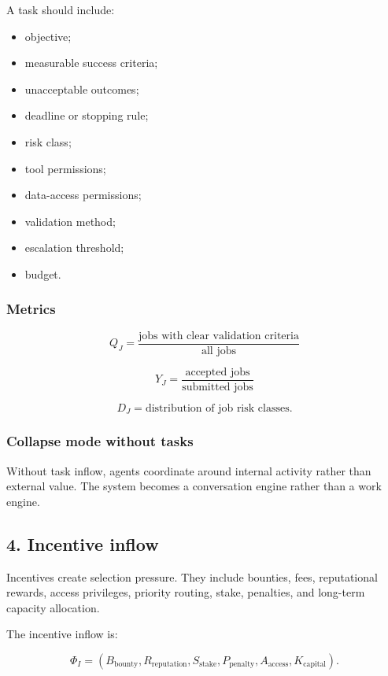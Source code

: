 A task should include:

\begin{itemize}
\tightlist
\item
  objective;
\item
  measurable success criteria;
\item
  unacceptable outcomes;
\item
  deadline or stopping rule;
\item
  risk class;
\item
  tool permissions;
\item
  data-access permissions;
\item
  validation method;
\item
  escalation threshold;
\item
  budget.
\end{itemize}

\subsubsection{Metrics}\label{metrics-2}

\[
Q_J=\frac{\text{jobs with clear validation criteria}}{\text{all jobs}}
\]

\[
Y_J=\frac{\text{accepted jobs}}{\text{submitted jobs}}
\]

\[
D_J=\text{distribution of job risk classes}.
\]

\subsubsection{Collapse mode without
tasks}\label{collapse-mode-without-tasks}

Without task inflow, agents coordinate around internal activity rather
than external value. The system becomes a conversation engine rather
than a work engine.

\subsection{4. Incentive inflow}\label{incentive-inflow}

Incentives create selection pressure. They include bounties, fees,
reputational rewards, access privileges, priority routing, stake,
penalties, and long-term capacity allocation.

The incentive inflow is:

\[
\Phi_I=(B_{\text{bounty}},R_{\text{reputation}},S_{\text{stake}},P_{\text{penalty}},A_{\text{access}},K_{\text{capital}}).
\]

